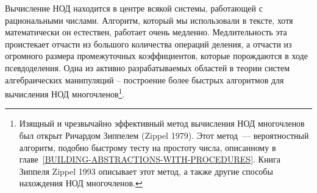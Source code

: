 \bigskip

Вычисление НОД находится в центре всякой системы,
работающей с рациональными числами.  Алгоритм, который мы использовали
в тексте, хотя математически он естествен, работает очень медленно.
Медлительность эта проистекает отчасти из большого количества операций
деления, а отчасти из огромного размера промежуточных коэффициентов,
которые порождаются в ходе псевдоделения.  Одна из активно
разрабатываемых областей в теории систем алгебраических манипуляций --
построение более быстрых алгоритмов для вычисления НОД
многочленов\footnote{Изящный и чрезвычайно эффективный метод вычисления
    
НОД многочленов был
открыт Ричардом Зиппелем (Zippel 1979).  
Этот метод~---  вероятностный
алгоритм, подобно быстрому тесту на простоту числа, описанному в 
главе~\ref{BUILDING-ABSTRACTIONS-WITH-PROCEDURES}. Книга Зиппеля
Zippel 1993 описывает этот метод, а также другие
способы нахождения НОД многочленов.}.
